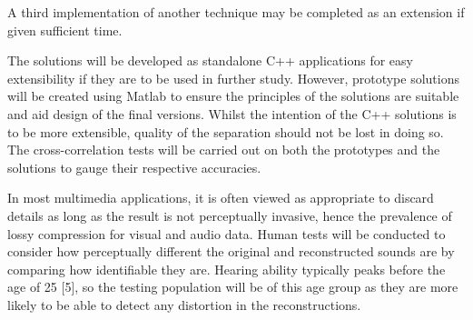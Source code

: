 \documentclass[12pt]{article}
\begin{document}
A third implementation of another technique may be completed as an extension if given sufficient time.

The solutions will be developed as standalone C++ applications for easy extensibility if they are to be used in further study. However, prototype solutions will be created using Matlab to ensure the principles of the solutions are suitable and aid design of the final versions. Whilst the intention of the C++ solutions is to be more extensible, quality of the separation should not be lost in doing so. The cross-correlation tests will be carried out on both the prototypes and the solutions to gauge their respective accuracies.

In most multimedia applications, it is often viewed as appropriate to discard details as long as the result is not perceptually invasive, hence the prevalence of lossy compression for visual and audio data. Human tests will be conducted to consider how perceptually different the original and reconstructed sounds are by comparing how identifiable they are. Hearing ability typically peaks before the age of 25 [5], so the testing population will be of this age group as they are more likely to be able to detect any distortion in the reconstructions.

%
%
%
%
%
\end{document}
